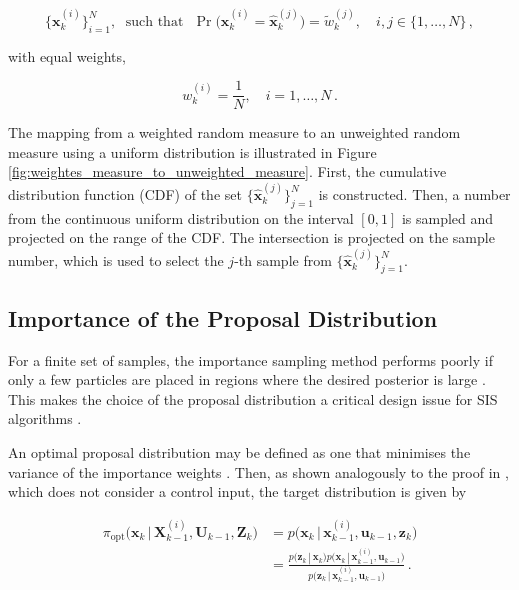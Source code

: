\begin{equation}\label{eq:resampling}
 \big\{\bm{x}^{(i)}_k\big\}_{i=1}^N,\:\:\, \text{such that} \:\:\:\operatorname{Pr}\big(\bm{x}^{(i)}_k = \hat{\bm{x}}^{(j)}_k\big) = \tilde{w}^{(j)}_k, \quad i, j \in \{1, \dots, N\}\,,
 \end{equation}

\noindent
with equal weights, 

\begin{equation}\label{eq:resampling_weights}
  w^{(i)}_k = \frac{1}{N}, \quad i = 1, \dots, N \,.
\end{equation}


\noindent
The mapping from a weighted random measure to an unweighted random measure using a uniform distribution is illustrated in Figure \ref{fig:weightes_measure_to_unweighted_measure}. First, the cumulative distribution function (CDF) of the set $\big\{\hat{\bm{x}}^{(j)}_k\big\}_{j=1}^N$ is constructed. Then, a number from the continuous uniform distribution on the interval $[0, 1]$ is sampled and projected on the range of the CDF. The intersection is projected on the sample number, which is used to select the $j$-th sample from $\big\{\hat{\bm{x}}^{(j)}_k\big\}_{j=1}^N$.


\subsection{Importance of the Proposal Distribution}\label{sec:importance_proposal}

For a finite set of samples, the importance sampling method performs poorly if only a few particles are placed in regions where the desired posterior is large \cite{chen2003bayesian}. This makes the choice of the proposal distribution a critical design issue for SIS algorithms \cite{merwe2000scented, daum2005nonlinear}.  

An optimal proposal distribution may be defined as one that minimises the variance of the importance weights \cite{doucet2001particle}. Then, as shown analogously to the proof in \cite{5546308}, which does not consider a control input, the target distribution is given by

\begin{equation}\label{eq:optimal_proposal}
\begin{split}
  \pi_{\mathrm{opt}}\big(\bm{x}_k\,|\,\bm{X}^{(i)}_{k-1}, \bm{U}_{k-1}, \bm{Z}_{k}\big) &= p\big(\bm{x}_k\,|\,\bm{x}^{(i)}_{k-1}, \bm{u}_{k-1}, \bm{z}_{k}\big) \\
  &=  \frac{p\big(\bm{z}_k\,|\,\bm{x}_k\big) p\big(\bm{x}_k\,|\,\bm{x}^{(i)}_{k-1}, \bm{u}_{k-1}\big)}{p\big(\bm{z}_k\,|\,\bm{x}^{(i)}_{k-1}, \bm{u}_{k-1}\big)} \,.
  \end{split}
\end{equation}

